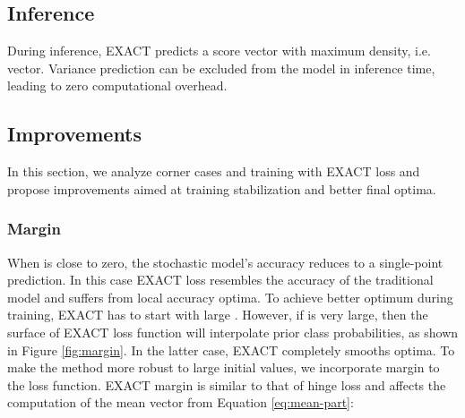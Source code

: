 \documentclass[nohyperref]{article}
\theoremstyle{plain}
\theoremstyle{definition}
\theoremstyle{remark}
\begin{document}
\subsection{Inference}


During inference, EXACT predicts a score vector with maximum density, i.e.  vector. Variance prediction can be excluded from the model in inference time, leading to zero computational overhead.

\subsection{Improvements}
In this section, we analyze corner cases and training with \mbox{EXACT} loss and propose improvements aimed at training stabilization and better final optima.

\subsubsection{Margin}
When  is close to zero, the stochastic model's accuracy reduces to a single-point prediction. In this case \mbox{EXACT} loss resembles the accuracy of the traditional model and suffers from local accuracy optima. To achieve better optimum during training, EXACT has to start with large . However, if  is very large, then the surface of EXACT loss function will interpolate prior class probabilities, as shown in Figure \ref{fig:margin}. In the latter case, EXACT completely smooths optima. To make the method more robust to large initial  values, we incorporate margin to the loss function.
EXACT margin is similar to that of hinge loss and affects the computation of the mean vector from Equation \ref{eq:mean-part}:
\end{document}
